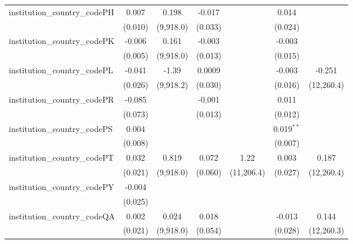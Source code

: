 \begin{tabular}{lcccccc}
   institution\_country\_codePH          & 0.007          & 0.198         & -0.017        &              & 0.014        &   \\   
                                         & (0.010)        & (9,918.0)     & (0.033)       &              & (0.024)      &   \\   
   institution\_country\_codePK          & -0.006         & 0.161         & -0.003        &              & -0.003       &   \\   
                                         & (0.005)        & (9,918.0)     & (0.013)       &              & (0.015)      &   \\   
   institution\_country\_codePL          & -0.041         & -1.39         & 0.0009        &              & -0.003       & -0.251\\   
                                         & (0.026)        & (9,918.2)     & (0.030)       &              & (0.016)      & (12,260.4)\\   
   institution\_country\_codePR          & -0.085         &               & -0.001        &              & 0.011        &   \\   
                                         & (0.073)        &               & (0.013)       &              & (0.012)      &   \\   
   institution\_country\_codePS          & 0.004          &               &               &              & 0.019$^{**}$ &   \\   
                                         & (0.008)        &               &               &              & (0.007)      &   \\   
   institution\_country\_codePT          & 0.032          & 0.819         & 0.072         & 1.22         & 0.003        & 0.187\\   
                                         & (0.021)        & (9,918.0)     & (0.060)       & (11,206.4)   & (0.027)      & (12,260.4)\\   
   institution\_country\_codePY          & -0.004         &               &               &              &              &   \\   
                                         & (0.025)        &               &               &              &              &   \\   
   institution\_country\_codeQA          & 0.002          & 0.024         & 0.018         &              & -0.013       & 0.144\\   
                                         & (0.021)        & (9,918.0)     & (0.054)       &              & (0.028)      & (12,260.3)\\   

\end{tabular}
